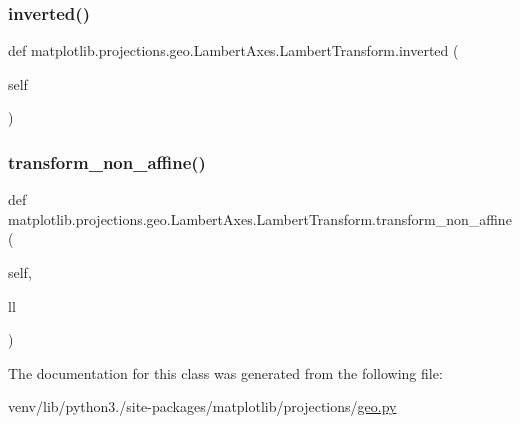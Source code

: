 \subsubsection{\texorpdfstring{inverted()}{inverted()}}
{\footnotesize\ttfamily def matplotlib.\+projections.\+geo.\+Lambert\+Axes.\+Lambert\+Transform.\+inverted (\begin{DoxyParamCaption}\item[{}]{self }\end{DoxyParamCaption})}

\mbox{\label{classmatplotlib_1_1projections_1_1geo_1_1LambertAxes_1_1LambertTransform_a73e8a6eea9e75dedbc1b86837e37bd56}} 
\subsubsection{\texorpdfstring{transform\+\_\+non\+\_\+affine()}{transform\_non\_affine()}}
{\footnotesize\ttfamily def matplotlib.\+projections.\+geo.\+Lambert\+Axes.\+Lambert\+Transform.\+transform\+\_\+non\+\_\+affine (\begin{DoxyParamCaption}\item[{}]{self,  }\item[{}]{ll }\end{DoxyParamCaption})}



The documentation for this class was generated from the following file\+:\begin{DoxyCompactItemize}
\item 
venv/lib/python3./site-\/packages/matplotlib/projections/\hyperlink{geo_8py}{geo.\+py}\end{DoxyCompactItemize}
